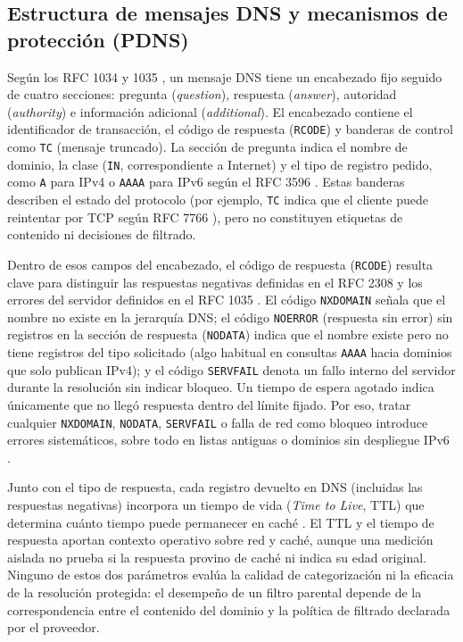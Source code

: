 \documentclass[10pt,a4paper]{article}
\begin{document}
\subsection{Estructura de mensajes DNS y mecanismos de protección (PDNS)}\label{subsec:dns-pdns}

Según los RFC 1034 y 1035 \cite{rfc1034,rfc1035}, un mensaje DNS tiene un encabezado fijo seguido de cuatro secciones: pregunta (\emph{question}), respuesta (\emph{answer}), autoridad (\emph{authority}) e información adicional (\emph{additional}). El encabezado contiene el identificador de transacción, el código de respuesta (\texttt{RCODE}) y banderas de control como \texttt{TC} (mensaje truncado). La sección de pregunta indica el nombre de dominio, la clase (\texttt{IN}, correspondiente a Internet) y el tipo de registro pedido, como \texttt{A} para IPv4 \cite{rfc1035} o \texttt{AAAA} para IPv6 según el RFC 3596 \cite{rfc3596}. Estas banderas describen el estado del protocolo (por ejemplo, \texttt{TC} indica que el cliente puede reintentar por TCP según RFC 7766 \cite{rfc7766}), pero no constituyen etiquetas de contenido ni decisiones de filtrado.

Dentro de esos campos del encabezado, el código de respuesta (\texttt{RCODE}) resulta clave para distinguir las respuestas negativas definidas en el RFC 2308 \cite{rfc2308} y los errores del servidor definidos en el RFC 1035 \cite{rfc1035}. El código \texttt{NXDOMAIN} señala que el nombre no existe en la jerarquía DNS; el código \texttt{NOERROR} (respuesta sin error) sin registros en la sección de respuesta (\texttt{NODATA}) indica que el nombre existe pero no tiene registros del tipo solicitado (algo habitual en consultas \texttt{AAAA} hacia dominios que solo publican IPv4); y el código \texttt{SERVFAIL} denota un fallo interno del servidor durante la resolución sin indicar bloqueo. Un tiempo de espera agotado indica únicamente que no llegó respuesta dentro del límite fijado. Por eso, tratar cualquier \texttt{NXDOMAIN}, \texttt{NODATA}, \texttt{SERVFAIL} o falla de red como bloqueo introduce errores sistemáticos, sobre todo en listas antiguas o dominios sin despliegue IPv6 \cite{liu2024,ooni2012,ooni}.

Junto con el tipo de respuesta, cada registro devuelto en DNS (incluidas las respuestas negativas) incorpora un tiempo de vida (\emph{Time to Live}, TTL) que determina cuánto tiempo puede permanecer en caché \cite{rfc1035,rfc2308}. El TTL y el tiempo de respuesta aportan contexto operativo sobre red y caché, aunque una medición aislada no prueba si la respuesta provino de caché ni indica su edad original. Ninguno de estos dos parámetros evalúa la calidad de categorización ni la eficacia de la resolución protegida: el desempeño de un filtro parental depende de la correspondencia entre el contenido del dominio y la política de filtrado declarada por el proveedor.
\end{document}
